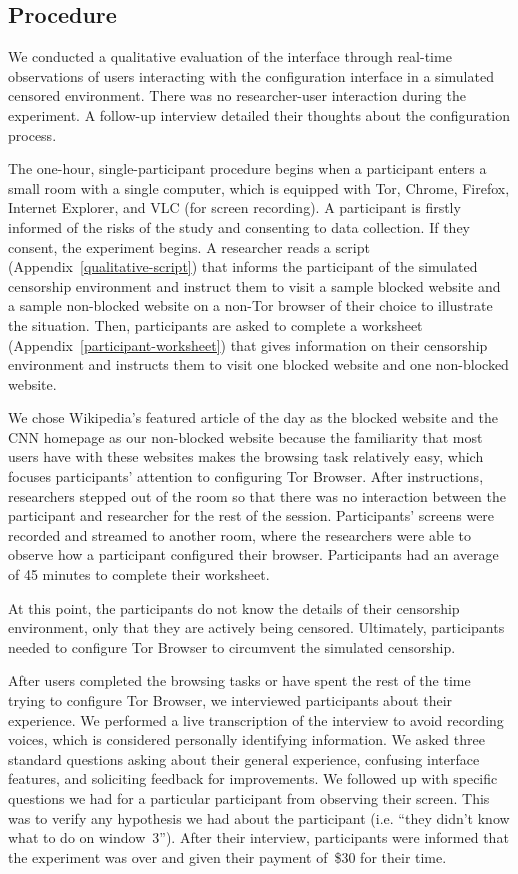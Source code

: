 \documentclass[USenglish,oneside,twocolumn]{article}
\begin{document}
\subsection{Procedure}
We conducted a qualitative evaluation of the interface through real-time observations of 
users interacting with the configuration interface in a simulated censored environment.
There was no researcher-user interaction during the experiment. A follow-up interview 
detailed their thoughts about the configuration process.

The one-hour, single-participant procedure begins when a participant enters a small 
room with a single computer, which is equipped with Tor, Chrome, Firefox, Internet Explorer, 
and VLC (for screen recording). A participant is firstly informed of 
the risks of the study and consenting to data collection. If they consent, the 
experiment begins. A researcher reads a script (Appendix~\ref{qualitative-script}) that 
informs the participant of the simulated censorship environment and
instruct them to visit a sample blocked website and a sample non-blocked website on a
non-Tor browser of their choice to illustrate the situation. Then, participants are asked to 
complete a worksheet (Appendix~\ref{participant-worksheet}) that gives information
on their censorship environment and instructs them
to visit one blocked website and one non-blocked website.
 
We chose Wikipedia's featured article of the day as the blocked website and 
the CNN homepage as our non-blocked website because the familiarity 
that most users have with these websites makes the browsing task relatively easy, 
which focuses participants' attention to configuring Tor Browser. 
After instructions, researchers stepped out of the room so that there was no interaction
between the participant and researcher for the rest of the session. Participants' screens 
were recorded and streamed to another room, where the researchers were able to 
observe how a participant configured their browser. Participants had an 
average of 45 minutes to complete their worksheet. 

At this point, the participants do not know the details of their censorship environment,
only that they are actively being censored. Ultimately, participants needed to configure Tor Browser to 
circumvent the simulated censorship. 

After users completed the browsing tasks or have spent the rest of the time
trying to configure Tor Browser, we interviewed participants about their experience.
We performed a live transcription of the interview to avoid recording voices, which is
considered personally identifying information. 
We asked three standard questions asking about their general experience, 
confusing interface features, and soliciting feedback for improvements. We followed up
with specific questions we had for a particular participant from observing their screen. 
This was to verify any hypothesis we had about the participant (i.e. ``they didn't know what to do on window~3'').  
After their interview, participants were informed that the experiment was over and 
given their payment of~\$30 for their time. 
\end{document}
